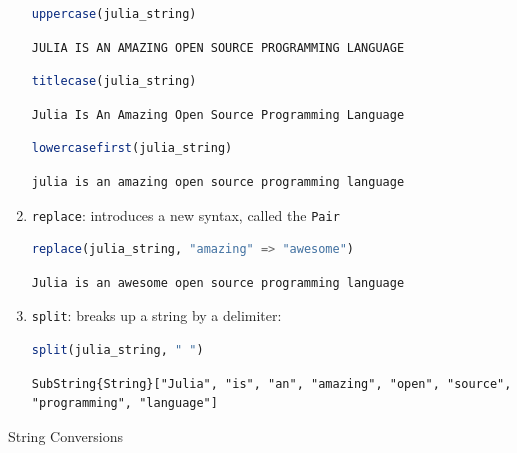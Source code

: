 \documentclass[
  notoc %
]{tufte-book}
\makeatletter
\newcommand{\passthrough}[1]{#1}
\renewcommand\subsubsection{%
\@startsection{subsubsection}{3}{\z@ }{-3.25ex\@plus -1ex \@minus -.2ex}{1.5ex \@plus .2ex}{\normalfont \normalsize \bfseries }
}
\makeatother
\begin{document}
\begin{enumerate}
  \begin{lstlisting}[language=Julia]
  uppercase(julia_string)
  \end{lstlisting}

  \begin{lstlisting}[language=Output]
  JULIA IS AN AMAZING OPEN SOURCE PROGRAMMING LANGUAGE
  \end{lstlisting}

  \begin{lstlisting}[language=Julia]
  titlecase(julia_string)
  \end{lstlisting}

  \begin{lstlisting}[language=Output]
  Julia Is An Amazing Open Source Programming Language
  \end{lstlisting}

  \begin{lstlisting}[language=Julia]
  lowercasefirst(julia_string)
  \end{lstlisting}

  \begin{lstlisting}[language=Output]
  julia is an amazing open source programming language
  \end{lstlisting}
\item
  \passthrough{\lstinline!replace!}: introduces a new syntax, called the
  \passthrough{\lstinline!Pair!}

  \begin{lstlisting}[language=Julia]
  replace(julia_string, "amazing" => "awesome")
  \end{lstlisting}

  \begin{lstlisting}[language=Output]
  Julia is an awesome open source programming language
  \end{lstlisting}
\item
  \passthrough{\lstinline!split!}: breaks up a string by a delimiter:

  \begin{lstlisting}[language=Julia]
  split(julia_string, " ")
  \end{lstlisting}

  \begin{lstlisting}[language=Output]
  SubString{String}["Julia", "is", "an", "amazing", "open", "source", "programming", "language"]
  \end{lstlisting}
\end{enumerate}

\hypertarget{sec:string_conversions}{%
\subsubsection{String Conversions}\label{sec:string_conversions}}
\end{document}
